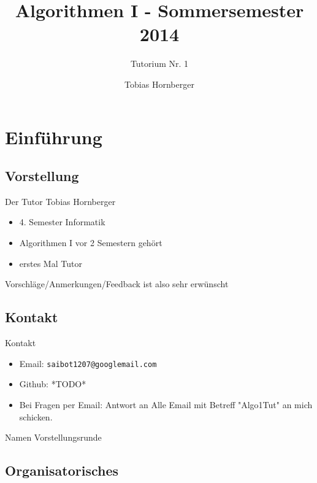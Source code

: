 \documentclass[18pt]{beamer}
\title[Algo Tutorium Nr.1]{Algorithmen I - Sommersemester 2014}
\subtitle{Tutorium Nr. 1}
\author{Tobias Hornberger}
\institute{Institut für Theoretische Informatik}
\begin{document}

\begin{frame}
\titlepage
\end{frame}


\section{Einführung}
	\subsection{Vorstellung}
	\begin{frame}{Der Tutor}
		Tobias Hornberger
		\begin{itemize}
			\item 4. Semester Informatik
			\item Algorithmen I vor 2 Semestern gehört
			\item erstes Mal Tutor
		\end{itemize}
		Vorschläge/Anmerkungen/Feedback ist also sehr erwünscht
	\end{frame}

	\subsection{Kontakt}
	\begin{frame}{Kontakt}
		
		\begin{itemize}
			\item Email: \texttt{saibot1207@googlemail.com}
			\item Github: *TODO*
			\item Bei Fragen per Email: Antwort an Alle
			Email mit Betreff "Algo1Tut" an mich schicken.
		\end{itemize}
	\end{frame}
	
	\begin{frame}{Namen}
		Vorstellungsrunde		
	\end{frame}

	\subsection{Organisatorisches}
\end{document}
